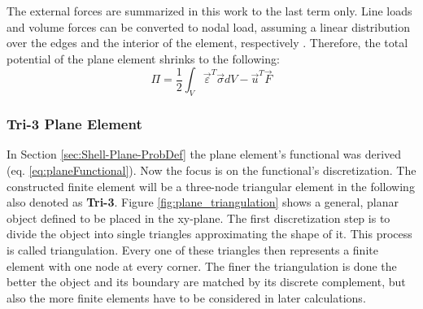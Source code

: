   The external forces are summarized in this work to the last term only. Line loads and volume forces can be converted to nodal load, assuming a linear distribution over the edges and the interior of the element, respectively \cite{steinke2005finite}. Therefore, the total potential of the plane element shrinks to the following:
  \begin{equation}\label{eq:planeFunctional}
  \Pi = \frac{1}{2} \int_{V}\vec{\varepsilon}^T\vec{\sigma}dV - \vec{u}^T \vec{F}
  \end{equation}
  
  
  
  
  
  
  
  
  \subsubsection{Tri-3 Plane Element}\label{sec:Shell-Plane-Tri}
  In Section \ref{sec:Shell-Plane-ProbDef} the plane element's functional was derived (eq. \eqref{eq:planeFunctional}). Now the focus is on the functional's discretization. The constructed finite element will be a three-node triangular element in the following also denoted as \textbf{Tri-3}. Figure \ref{fig:plane_triangulation} shows a general, planar object defined to be placed in the xy-plane. The first discretization step is to divide the object into single triangles approximating the shape of it. This process is called triangulation. Every one of these triangles then represents a finite element with one node at every corner. The finer the triangulation is done the better the object and its boundary are matched by its discrete complement, but also the more finite elements have to be considered in later calculations.
